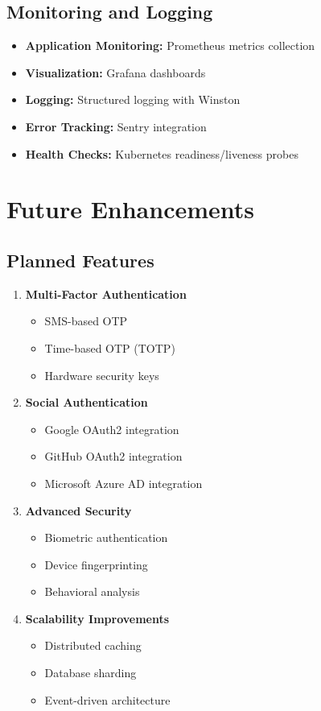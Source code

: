 \documentclass[12pt,a4paper]{article}
\begin{document}
\subsection{Monitoring and Logging}

\begin{itemize}
    \item \textbf{Application Monitoring:} Prometheus metrics collection
    \item \textbf{Visualization:} Grafana dashboards
    \item \textbf{Logging:} Structured logging with Winston
    \item \textbf{Error Tracking:} Sentry integration
    \item \textbf{Health Checks:} Kubernetes readiness/liveness probes
\end{itemize}

\section{Future Enhancements}

\subsection{Planned Features}

\begin{enumerate}
    \item \textbf{Multi-Factor Authentication}
    \begin{itemize}
        \item SMS-based OTP
        \item Time-based OTP (TOTP)
        \item Hardware security keys
    \end{itemize}
    
    \item \textbf{Social Authentication}
    \begin{itemize}
        \item Google OAuth2 integration
        \item GitHub OAuth2 integration
        \item Microsoft Azure AD integration
    \end{itemize}
    
    \item \textbf{Advanced Security}
    \begin{itemize}
        \item Biometric authentication
        \item Device fingerprinting
        \item Behavioral analysis
    \end{itemize}
    
    \item \textbf{Scalability Improvements}
    \begin{itemize}
        \item Distributed caching
        \item Database sharding
        \item Event-driven architecture
    \end{itemize}
\end{enumerate}
\end{document}
